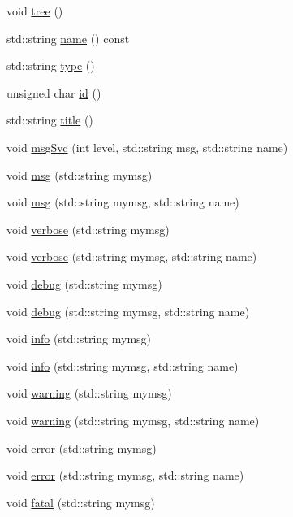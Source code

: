 \begin{DoxyCompactItemize}
void \hyperlink{classHierarchy_a594c294c5f60c230e106d522ed008212}{tree} ()
\item 
std::string \hyperlink{classObject_a975e888d50bfcbffda2c86368332a5cd}{name} () const 
\item 
std::string \hyperlink{classObject_a84f99f70f144a83e1582d1d0f84e4e62}{type} ()
\item 
unsigned char \hyperlink{classObject_af99145335cc61ff6e2798ea17db009d2}{id} ()
\item 
std::string \hyperlink{classObject_a73a0f1a41828fdd8303dd662446fb6c3}{title} ()
\item 
void \hyperlink{classObject_a3f9d5537ebce0c0f2bf6ae4d92426f3c}{msgSvc} (int level, std::string msg, std::string name)
\item 
void \hyperlink{classObject_a58b2d0618c2d08cf2383012611528d97}{msg} (std::string mymsg)
\item 
void \hyperlink{classObject_ac5d59299273cee27aacf7de00d2e7034}{msg} (std::string mymsg, std::string name)
\item 
void \hyperlink{classObject_a83d2db2df682907ea1115ad721c1c4a1}{verbose} (std::string mymsg)
\item 
void \hyperlink{classObject_a2d4120195317e2a3c6532e8bb9f3da68}{verbose} (std::string mymsg, std::string name)
\item 
void \hyperlink{classObject_aac010553f022165573714b7014a15f0d}{debug} (std::string mymsg)
\item 
void \hyperlink{classObject_a6c9a0397ca804e04d675ed05683f5420}{debug} (std::string mymsg, std::string name)
\item 
void \hyperlink{classObject_a644fd329ea4cb85f54fa6846484b84a8}{info} (std::string mymsg)
\item 
void \hyperlink{classObject_a1ca123253dfd30fc28b156f521dcbdae}{info} (std::string mymsg, std::string name)
\item 
void \hyperlink{classObject_a65cd4fda577711660821fd2cd5a3b4c9}{warning} (std::string mymsg)
\item 
void \hyperlink{classObject_a11f101db4dd73d9391b0231818881d86}{warning} (std::string mymsg, std::string name)
\item 
void \hyperlink{classObject_a204a95f57818c0f811933917a30eff45}{error} (std::string mymsg)
\item 
void \hyperlink{classObject_ad7f6c457733082efa2f9ff5f5c8e119a}{error} (std::string mymsg, std::string name)
\item 
void \hyperlink{classObject_aad5a16aac7516ce65bd5ec02ab07fc80}{fatal} (std::string mymsg)

\end{DoxyCompactItemize}
